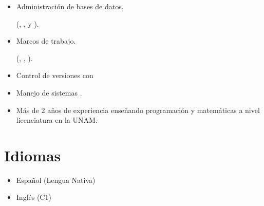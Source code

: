 \documentclass{resume}
\begin{document}
\begin{paracol}{2}
\begin{itemize}
          (, , ).
          
        \item Administración de bases de datos.
          
          (, , y ).
          
        \item Marcos de trabajo.
          
          (, , ).
          
        \item Control de versiones con 
          
        \item Manejo de sistemas .
       
        \item Más de 2 años de experiencia enseñando programación y matemáticas
          a nivel licenciatura en la UNAM.

      \end{itemize}
      
    \section{Idiomas}
    
      \begin{itemize}
        \item Español (Lengua Nativa)
        \item Inglés (C1)
      \end{itemize}
    
  \end{paracol}
\end{document}

